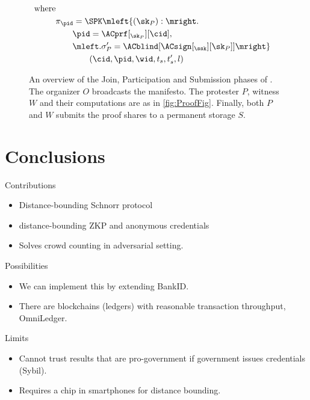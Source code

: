 \begin{figure}
\begin{minipage}{\linewidth}
\begin{align*}
      \text{where}\\
        & \pi_{\pid} = \SPK\mleft\{ (\sk_P) : \mright. \\
        & \qquad \pid = \ACprf[_{\sk_P}][\cid], \\
        & \qquad \mleft. \sigma_P' = \ACblind[\ACsign[_{\ssk}][\sk_P]] \mright\} 
        \\
        & \qquad\qquad (\cid, \pid, \wid, t_s, t_s', l)
    \end{align*}
  \end{minipage}
  \caption{%
    An overview of the Join, Participation and Submission phases of \PRIVO.\@
    The organizer \(O\) broadcasts the manifesto.
    The protester \(P\), witness \(W\) and their computations are as in \cref{fig:ProofFig}.
    Finally, both \(P\) and \(W\) submits the proof shares to a permanent storage \(S\).
  }%
  \label{fig:ProtocolOverview}
\end{figure}

\section{Conclusions}

\begin{frame}
  \begin{block}{Contributions}
    \begin{itemize}
      \item Distance-bounding Schnorr protocol
      \item \Ie distance-bounding \acs{ZKP} and anonymous credentials
      \item Solves crowd counting in adversarial setting.
    \end{itemize}
  \end{block}
\end{frame}

\begin{frame}
  \begin{greenblock}{Possibilities}
    \begin{itemize}
      \item We can implement this by extending BankID.
      \item There are blockchains (ledgers) with reasonable transaction 
        throughput, \eg OmniLedger.
    \end{itemize}
  \end{greenblock}

  \begin{alertblock}{Limits}
    \begin{itemize}
      \item Cannot trust results that are pro-government if government issues 
        credentials (Sybil).

      \item Requires a chip in smartphones for distance bounding.
    \end{itemize}
  \end{alertblock}
\end{frame}
